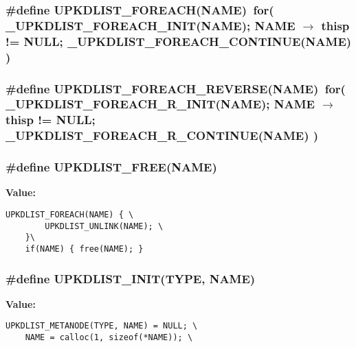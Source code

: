 \subsubsection{\setlength{\rightskip}{0pt plus 5cm}\#define UPKDLIST\_\-FOREACH(NAME)~for( \_\-UPKDLIST\_\-FOREACH\_\-INIT(NAME); NAME $\rightarrow$ thisp != NULL; \_\-UPKDLIST\_\-FOREACH\_\-CONTINUE(NAME) )}\label{types_8h_fca752d33e735d8db5585462eb74f5d9}


\subsubsection{\setlength{\rightskip}{0pt plus 5cm}\#define UPKDLIST\_\-FOREACH\_\-REVERSE(NAME)~for( \_\-UPKDLIST\_\-FOREACH\_\-R\_\-INIT(NAME); NAME $\rightarrow$ thisp != NULL; \_\-UPKDLIST\_\-FOREACH\_\-R\_\-CONTINUE(NAME) )}\label{types_8h_c64ef3ba5fab775f033008d8d6f6fb57}


\subsubsection{\setlength{\rightskip}{0pt plus 5cm}\#define UPKDLIST\_\-FREE(NAME)}\label{types_8h_8a8cb0fd6c6396c9ca9d9880e2ba5c8c}


\textbf{Value:}

\begin{Code}\begin{verbatim}UPKDLIST_FOREACH(NAME) { \
        UPKDLIST_UNLINK(NAME); \
    }\
    if(NAME) { free(NAME); }
\end{verbatim}\end{Code}
\subsubsection{\setlength{\rightskip}{0pt plus 5cm}\#define UPKDLIST\_\-INIT(TYPE, NAME)}\label{types_8h_dc1df1019357338d3c36b66addec3d72}


\textbf{Value:}

\begin{Code}\begin{verbatim}UPKDLIST_METANODE(TYPE, NAME) = NULL; \
    NAME = calloc(1, sizeof(*NAME)); \
\end{verbatim}\end{Code}
